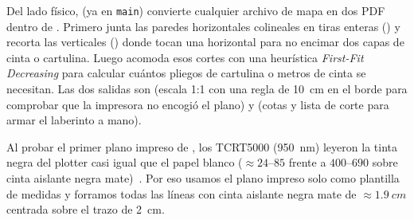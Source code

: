 Del lado físico,  (ya en \texttt{main}) convierte cualquier archivo de mapa en dos PDF dentro de . Primero  junta las paredes horizontales colineales en tiras enteras () y recorta las verticales () donde tocan una horizontal para no encimar dos capas de cinta o cartulina. Luego  acomoda esos cortes con una heurística \textit{First-Fit Decreasing} para calcular cuántos pliegos de cartulina o metros de cinta se necesitan. Las dos salidas son  (escala 1:1 con una regla de \SI{10}{cm} en el borde para comprobar que la impresora no encogió el plano) y  (cotas y lista de corte para armar el laberinto a mano).

\begin{hallazgo}
Al probar el primer plano impreso de , los TCRT5000 (\SI{950}{nm}) leyeron la tinta negra del plotter casi igual que el papel blanco ($\approx 24\text{--}85$ frente a $400\text{--}690$ sobre cinta aislante negra mate)~\cite{arquitectura2026doc}. Por eso usamos el plano impreso solo como plantilla de medidas y forramos todas las líneas con cinta aislante negra mate de $\approx\SI{1.9}{cm}$ centrada sobre el trazo de \SI{2}{cm}.
\end{hallazgo}
